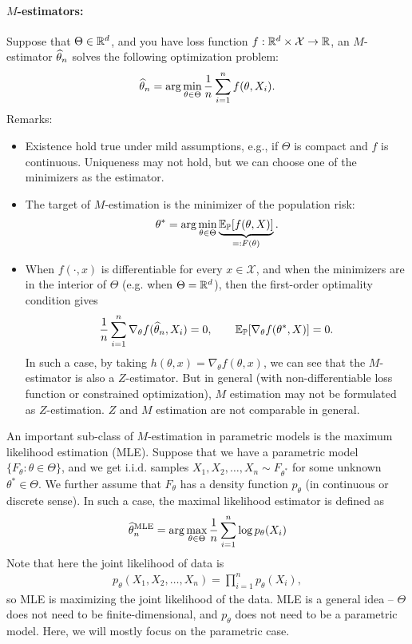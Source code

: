 \documentclass[11pt,letterpaper]{article}
\numberwithin{assumption}{lecture}
\numberwithin{theorem}{lecture}
\numberwithin{proposition}{lecture}
\numberwithin{lemma}{lecture}
\numberwithin{claim}{lecture}
\numberwithin{corollary}{lecture}
\numberwithin{definition}{lecture}
\numberwithin{conjecture}{lecture}
\numberwithin{remark}{lecture}
\numberwithin{example}{lecture}
\numberwithin{equation}{lecture}
\begin{document}
\paragraph{$M$-estimators:} Suppose that $\Theta \in \mathbb{R}^d$, and you have loss function $f: \mathbb{R}^d \times \mathcal{X} \to \mathbb{R}$, an $M$-estimator $\widehat{\theta}_n$ solves the following optimization problem:
\begin{align*}
  \widehat{\theta}_n = \arg\min_{\theta \in \Theta} \frac{1}{n} \sum_{i=1}^n f(\theta, X_i).
\end{align*}
Remarks:
\begin{itemize}
\item Existence hold true under mild assumptions, e.g., if $\Theta$ is compact and $f$ is continuous. Uniqueness may not hold, but we can choose one of the minimizers as the estimator.
\item The target of $M$-estimation is the minimizer of the population risk:
\begin{align*}
  \theta^* = \arg\min_{\theta \in \Theta} \underbrace{{\mathbb{E}}_{{\mathbb{P}}} [f(\theta, X)] }_{=: F(\theta)}.
\end{align*}
\item When $f (\cdot, x)$ is differentiable for every $x \in \mathcal{X}$, and when the minimizers are in the interior of $\Theta$ (e.g. when $\Theta = \mathbb{R}^d$), then the first-order optimality condition gives
\begin{align*}
  \frac{1}{n} \sum_{i=1}^n \nabla_\theta f(\widehat{\theta}_n, X_i) = 0, \qquad {\mathbb{E}}_{{\mathbb{P}}} [\nabla_\theta f(\theta^*, X)] = 0.
\end{align*}
In such a case, by taking $h(\theta, x) = \nabla_\theta f(\theta, x)$, we can see that the $M$-estimator is also a $Z$-estimator. But in general (with non-differentiable loss function or constrained optimization), $M$ estimation may not be formulated as $Z$-estimation. $Z$ and $M$ estimation are not comparable in general.
\end{itemize}
An important sub-class of $M$-estimation in parametric models is the maximum likelihood estimation (MLE). Suppose that we have a parametric model $\{F_\theta: \theta \in \Theta\}$, and we get $\mathrm{i.i.d.}$ samples $X_1, X_2, \ldots, X_n \sim F_{\theta^*}$ for some unknown $\theta^* \in \Theta$. We further assume that $F_\theta$ has a density function $p_\theta$ (in continuous or discrete sense). In such a case, the maximal likelihood estimator is defined as
\begin{align*}
  \widehat{\theta}_n^{\mathrm{MLE}} = \arg\max_{\theta \in \Theta} \frac{1}{n} \sum_{i=1}^n \log p_\theta (X_i)
\end{align*}
Note that here the joint likelihood of data is
\begin{align*}
  p_\theta (X_1, X_2, \ldots, X_n) = \prod_{i=1}^n p_\theta (X_i),
\end{align*}
so MLE is maximizing the joint likelihood of the data. MLE is a general idea -- $\Theta$ does not need to be finite-dimensional, and $p_\theta$ does not need to be a parametric model. Here, we will mostly focus on the parametric case.
\end{document}
